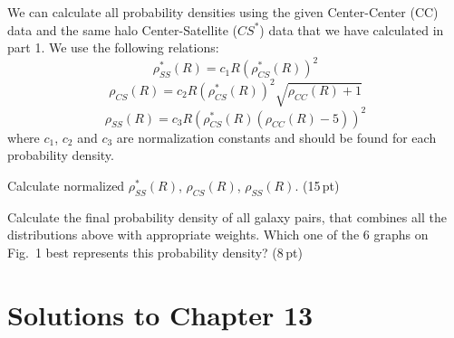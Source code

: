 \begin{description}
  We can calculate all probability densities using the given Center-Center
  (CC) data and the same halo Center-Satellite ($CS^*$) data that we have
  calculated in part 1. We use the following relations:
  \[ \rho_{SS}^*(R) = c_1 R\left(\rho_{CS}^*(R)\right)^2 \]
  \[ \rho_{CS}(R) = c_2 R\left(\rho_{CS}^*(R)\right)^2
     \sqrt{\rho_{CC}(R) + 1} \]
  \[ \rho_{SS}(R) = c_3 R\left(\rho_{CS}^*(R)\left(\rho_{CC}(R)
     - 5\right)\right)^2 \]
  where $c_1$, $c_2$ and $c_3$ are normalization constants and should be found
  for each probability density.
\item[b)] Calculate normalized $\rho_{SS}^*(R)$, $\rho_{CS}(R)$,
  $\rho_{SS}(R)$. \hfill(15\,pt)
\item[c)] Calculate the final probability density of all galaxy pairs, that
  combines all the distributions above with appropriate weights. Which one of
  the 6 graphs on Fig.~1 best represents this probability density?
  \hfill(8\,pt)
\end{description}

\clearpage
\section*{Solutions to Chapter 13}


